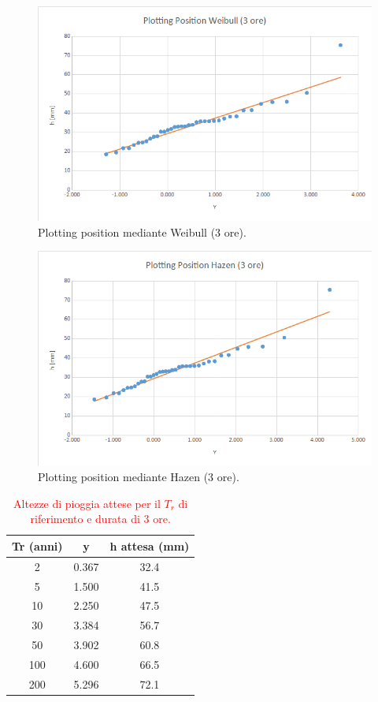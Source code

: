     \begin{figure}[H]\centering
        \includegraphics[scale=.5]{immagini/plot_pos_weib_3ore.png}
        \caption{Plotting position mediante Weibull (3 ore).}
      \label{plot_pos_weib_3ore}
 \end{figure}

\begin{figure}[H]\centering
        \includegraphics[scale=.5]{immagini/plot_pos_hazen_3ore.png}
        \caption{Plotting position mediante Hazen (3 ore).}
      \label{plot_pos_hazen_3ore}
\end{figure}

\begin{table}[H] \centering
    \caption{\textcolor{red}{Altezze di pioggia attese per il $T_r$ di riferimento e durata di 3 ore.}}
        \begin{tabular}{ccc}
        \toprule
        Tr (anni) & y     & h attesa (mm) \\
        \midrule
        2 & 0.367 & 32.4  \\
        5 & 1.500 & 41.5  \\
        10  & 2.250 & 47.5          \\
        30  & 3.384 & 56.7          \\
        50  & 3.902 & 60.8          \\
        100 & 4.600 & 66.5          \\
        200 & 5.296 & 72.1          \\         
        \bottomrule
        \end{tabular}
\end{table}

